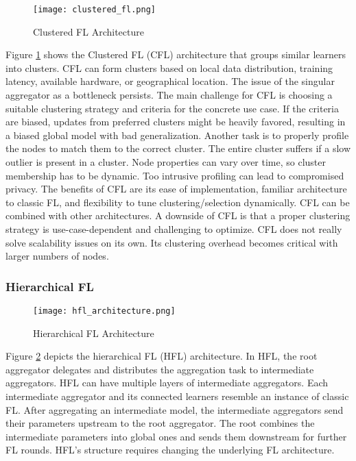 \begin{figure}[b]
    \centering
    \texttt{[image: clustered\_fl.png]}
    \caption{Clustered FL Architecture}
    \label{fig:clustered_fl}
\end{figure}
Figure \ref{fig:clustered_fl} shows the Clustered FL (CFL) architecture that groups similar learners into clusters.
CFL can form clusters based on local data distribution, training latency, available hardware, or geographical location.
The issue of the singular aggregator as a bottleneck persists.
The main challenge for CFL is choosing a suitable clustering strategy and criteria for the concrete use case.
If the criteria are biased, updates from preferred clusters might be heavily favored, resulting in a biased global model with bad generalization.
Another task is to properly profile the nodes to match them to the correct cluster.
The entire cluster suffers if a slow outlier is present in a cluster.
Node properties can vary over time, so cluster membership has to be dynamic.
Too intrusive profiling can lead to compromised privacy.
The benefits of CFL are its ease of implementation, familiar architecture to classic FL, and flexibility to tune clustering/selection dynamically.
CFL can be combined with other architectures.
A downside of CFL is that a proper clustering strategy is use-case-dependent and challenging to optimize.
CFL does not really solve scalability issues on its own.
Its clustering overhead becomes critical with larger numbers of nodes.
\cite{
    paper:cluster_based_secure_aggregation_for_fl,
    paper:fedat_high_performance_communication_efficient_fl_with_asynch_tiers,
    book:fl,paper:decentralized_edge_intelligence_dynamic_resource_allocation_framework_hfl}

\subsubsection{Hierarchical FL}
\begin{figure}[b]
    \centering
    \texttt{[image: hfl\_architecture.png]}
    \caption{Hierarchical FL Architecture}
    \label{fig:hfl_architecture}
\end{figure}
Figure \ref{fig:hfl_architecture} depicts the hierarchical FL (HFL) architecture.
In HFL, the root aggregator delegates and distributes the aggregation task to intermediate aggregators.
HFL can have multiple layers of intermediate aggregators.
Each intermediate aggregator and its connected learners resemble an instance of classic FL.
After aggregating an intermediate model, the intermediate aggregators send their parameters upstream to the root aggregator.
The root combines the intermediate parameters into global ones and sends them downstream for further FL rounds.
HFL's structure requires changing the underlying FL architecture.

